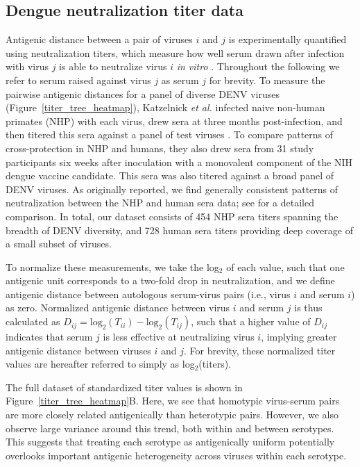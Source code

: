 \documentclass[11pt,oneside,letterpaper]{article}
\begin{document}
\subsection*{Dengue neutralization titer data}

Antigenic distance between a pair of viruses $i$ and $j$ is experimentally quantified using neutralization titers, which measure how well serum drawn after infection with virus $j$ is able to neutralize virus $i$ \textit{in vitro} \citep{russell1967dengue}.
Throughout the following we refer to serum raised against virus $j$ as serum $j$ for brevity.
To measure the pairwise antigenic distances for a panel of diverse DENV viruses (Figure~\ref{titer_tree_heatmap}), Katzelnick \textit{et al.} infected naive non-human primates (NHP) with each virus, drew sera at three months post-infection, and then titered this sera against a panel of test viruses \citep{katzelnick2015dengue}.
To compare patterns of cross-protection in NHP and humans, they also drew sera from 31 study participants six weeks after inoculation with a monovalent component of the NIH dengue vaccine candidate.
This sera was also titered against a broad panel of DENV viruses.
As originally reported, we find generally consistent patterns of neutralization between the NHP and human sera data; see \citet{katzelnick2015dengue} for a detailed comparison.
In total, our dataset consists of 454 NHP sera titers spanning the breadth of DENV diversity, and 728 human sera titers providing deep coverage of a small subset of viruses.

To normalize these measurements, we take the log$_2$ of each value, such that one antigenic unit corresponds to a two-fold drop in neutralization, and we define antigenic distance between autologous serum-virus pairs (i.e., virus $i$ and serum $i$) as zero.
Normalized antigenic distance between virus $i$ and serum $j$ is thus calculated as $D_{ij} = \mathrm{log}_2(T_{ii}) - \mathrm{log}_2(T_{ij})$, such that a higher value of $D_{ij}$ indicates that serum $j$ is less effective at neutralizing virus $i$, implying greater antigenic distance between viruses $i$ and $j$.
For brevity, these normalized titer values are hereafter referred to simply as log$_2$(titers).

The full dataset of standardized titer values is shown in Figure~\ref{titer_tree_heatmap}B.
Here, we see that homotypic virus-serum pairs are more closely related antigenically than heterotypic pairs.
However, we also observe large variance around this trend, both within and between serotypes.
This suggests that treating each serotype as antigenically uniform potentially overlooks important antigenic heterogeneity across viruses within each serotype.
\end{document}
